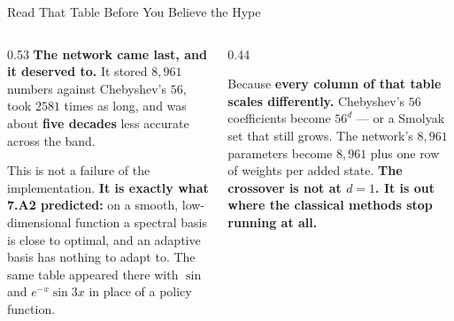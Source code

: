 \begin{frame}{Read That Table Before You Believe the Hype}
\begin{columns}[T]
\begin{column}{0.53\textwidth}
\small
\textbf{The network came last, and it deserved to.} It stored $8{,}961$ numbers against Chebyshev's $56$, took $2581$ times as long, and was about \textbf{five decades} less accurate across the band.
\medskip

This is not a failure of the implementation. \textbf{It is exactly what 7.A2 predicted:} on a smooth, low-dimensional function a spectral basis is close to optimal, and an adaptive basis has nothing to adapt to. The same table appeared there with $\sin$ and $e^{-x}\sin 3x$ in place of a policy function.
\end{column}
\begin{column}{0.44\textwidth}
\begin{takeawaybox}[title=\textbf{So why learn the method?}]\small
Because \textbf{every column of that table scales differently.}
\medskip
Chebyshev's $56$ coefficients become $56^{d}$ --- or a Smolyak set that still grows. The network's $8{,}961$ parameters become $8{,}961$ plus one row of weights per added state.
\medskip
\textbf{The crossover is not at $d=1$. It is out where the classical methods stop running at all.}
\end{takeawaybox}
\end{column}
\end{columns}
\vspace{1mm}
\end{frame}

